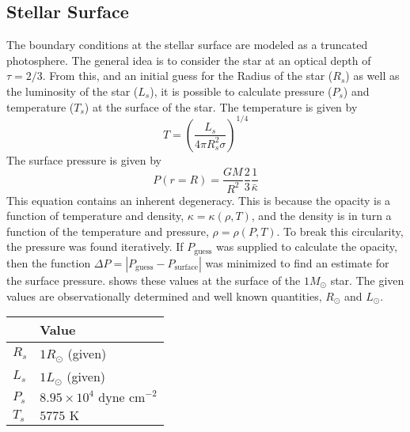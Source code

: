 \documentclass[12pt]{article}
\renewcommand{\ll}{\left} %
\newcommand{\rr}{\right} %
\newcommand{\txt}{\textrm} %
\newcommand{\unit}[1]{\txt{ #1}} %
\newcommand{\E}[1]{\times 10^{#1}} %
\begin{document}
\subsection{Stellar Surface}
The boundary conditions at the stellar surface are modeled as a truncated photosphere. The general idea is to consider the star at an optical depth of $\tau = 2/3$. From this, and an initial guess for the Radius of the star ($R_s$) as well as the luminosity of the star ($L_s$), it is possible to calculate pressure ($P_s$) and temperature ($T_s$) at the surface of the star. The temperature is given by
\begin{equation}\label{eqn:surfacet}
T = \left(\frac{L_s}{4\pi R_s^2 \sigma}\right)^{1/4}
\end{equation}
The surface pressure is given by
\begin{equation}
P(r=R) = \frac{GM}{R^2} \frac{2}{3} \frac{1}{\bar{\kappa}}
\end{equation}
This equation contains an inherent degeneracy. This is because the opacity is a function of temperature and density, $\kappa = \kappa(\rho,T)$, and the density is in turn a function of the temperature and pressure, $\rho = \rho(P,T)$. To break this circularity, the pressure was found iteratively. If $P_\txt{guess}$ was supplied to calculate the opacity, then the function $\Delta P = \ll| P_\txt{guess} - P_\txt{surface} \rr|$ was minimized to find an estimate for the surface pressure.  shows these values at the surface of the $1M_\odot$ star. The given values are observationally determined and well known quantities, $R_\odot$ and $L_\odot$.

\begin{table}[htbp]
   \centering
   \begin{tabular}{@{} l|l @{}} 
   & Value \\ \hline \hline
   $R_s$ & $1 R_\odot$ (given)\\
   $L_s$ & $1 L_\odot$ (given) \\
   $P_s$ & $8.95\E{4} \unit{dyne cm}^{-2}$ \\
   $T_s$ & $5775 \unit{K}$
   \end{tabular}
   \label{tab:surface}
\end{table}

\end{document}
